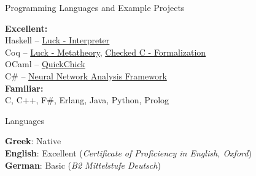 \documentclass{resume} %
\begin{document}

\begin{rSection}{Programming Languages and Example Projects}

  {\bf Excellent:}\\
  Haskell -- \href {https://github.com/QuickChick/Luck/tree/master/luck}{ Luck - Interpreter}\\
  Coq -- \href{https://github.com/QuickChick/Luck/tree/master/coq}{ Luck - Metatheory}, \href{https://github.com/plum-umd/checkedc/tree/master/coq}{Checked C - Formalization}\\
  OCaml -- \href{https://github.com/QuickChick/QuickChick}{QuickChick}\\
  C\# -- \href{https://github.com/microsoft/NeuralNetworkAnalysis}{Neural Network Analysis Framework}\\

  {\bf Familiar:}\\
  C, C++, F\#, Erlang, Java, Python, Prolog

\end{rSection}

\begin{rSection}{Languages}

  {\bf Greek}: Native \\
  {\bf English}: Excellent ({\em Certificate of Proficiency in English, Oxford})\\
  {\bf German}: Basic ({\em B2 Mittelstufe Deutsch})\\
\end{rSection}



\end{document}
